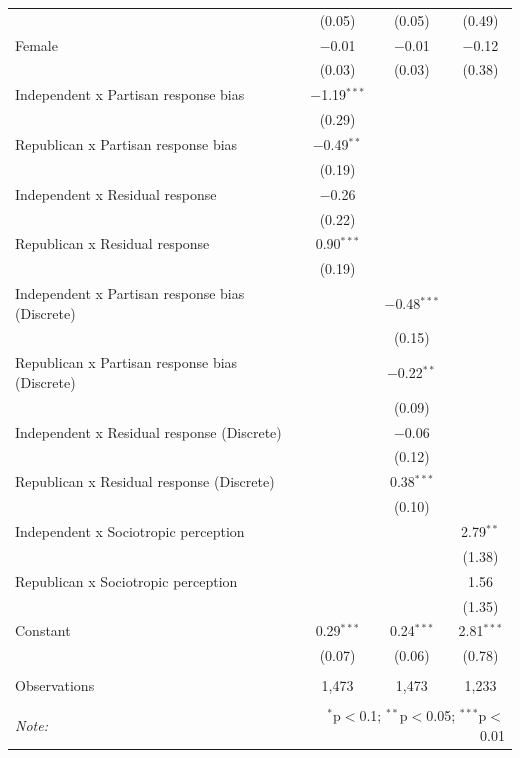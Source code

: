 \documentclass{article}\usepackage[]{graphicx}\usepackage[]{xcolor}
\begin{document}
\begin{table}[H]
\begin{tabular}{@{\extracolsep{5pt}}lccc}
  & (0.05) & (0.05) & (0.49) \\ 
  Female & $-$0.01 & $-$0.01 & $-$0.12 \\ 
  & (0.03) & (0.03) & (0.38) \\ 
  Independent x Partisan response bias & $-$1.19$^{***}$ &  &  \\ 
  & (0.29) &  &  \\ 
  Republican x Partisan response bias & $-$0.49$^{**}$ &  &  \\ 
  & (0.19) &  &  \\ 
  Independent x Residual response & $-$0.26 &  &  \\ 
  & (0.22) &  &  \\ 
  Republican x Residual response & 0.90$^{***}$ &  &  \\ 
  & (0.19) &  &  \\ 
  Independent x Partisan response bias (Discrete) &  & $-$0.48$^{***}$ &  \\ 
  &  & (0.15) &  \\ 
  Republican x Partisan response bias (Discrete) &  & $-$0.22$^{**}$ &  \\ 
  &  & (0.09) &  \\ 
  Independent x Residual response (Discrete) &  & $-$0.06 &  \\ 
  &  & (0.12) &  \\ 
  Republican x Residual response (Discrete) &  & 0.38$^{***}$ &  \\ 
  &  & (0.10) &  \\ 
  Independent x Sociotropic perception &  &  & 2.79$^{**}$ \\ 
  &  &  & (1.38) \\ 
  Republican x Sociotropic perception &  &  & 1.56 \\ 
  &  &  & (1.35) \\ 
  Constant & 0.29$^{***}$ & 0.24$^{***}$ & 2.81$^{***}$ \\ 
  & (0.07) & (0.06) & (0.78) \\ 
 \hline \\[-1.8ex] 
Observations & 1,473 & 1,473 & 1,233 \\ 
\hline 
\hline \\[-1.8ex] 
\textit{Note:}  & \multicolumn{3}{r}{$^{*}$p$<$0.1; $^{**}$p$<$0.05; $^{***}$p$<$0.01} \\ 
\end{tabular} 
\endgroup 

\end{table}
\end{document}
